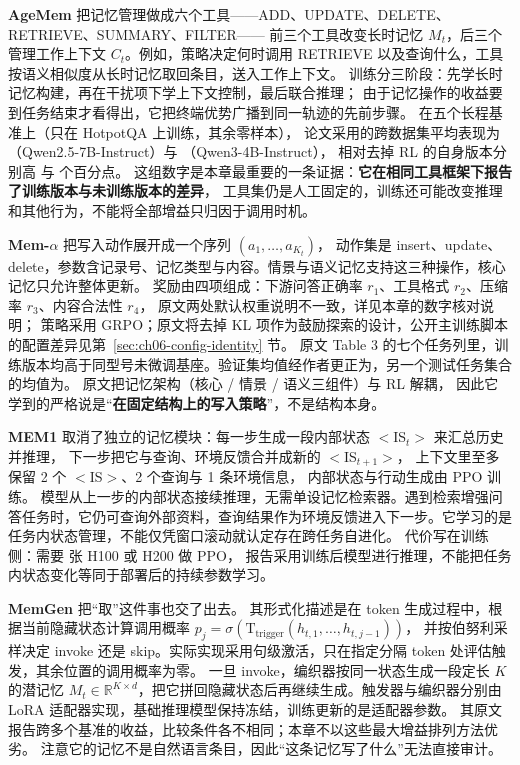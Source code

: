 \textbf{AgeMem} 把记忆管理做成六个工具——ADD、UPDATE、DELETE、RETRIEVE、SUMMARY、FILTER——
前三个工具改变长时记忆 $M_t$，后三个管理工作上下文 $C_t$。例如，策略决定何时调用 RETRIEVE 以及查询什么，工具按语义相似度从长时记忆取回条目，送入工作上下文。
训练分三阶段：先学长时记忆构建，再在干扰项下学上下文控制，最后联合推理；
由于记忆操作的收益要到任务结束才看得出，它把终端优势广播到同一轨迹的先前步骤\cite{agemem-2601}。
在五个长程基准上（只在 HotpotQA 上训练，其余零样本），
论文采用的跨数据集平均表现为 （Qwen2.5-7B-Instruct）与 （Qwen3-4B-Instruct），
相对去掉 RL 的自身版本分别高  与  个百分点\cite{agemem-2601}。
这组数字是本章最重要的一条证据：\textbf{它在相同工具框架下报告了训练版本与未训练版本的差异}，
工具集仍是人工固定的，训练还可能改变推理和其他行为，不能将全部增益只归因于调用时机。

\textbf{Mem-$\alpha$} 把写入动作展开成一个序列 $(a_1,\dots,a_{K_t})$，
动作集是 insert、update、delete，参数含记录号、记忆类型与内容。情景与语义记忆支持这三种操作，核心记忆只允许整体更新。
奖励由四项组成：下游问答正确率 $r_1$、工具格式 $r_2$、压缩率 $r_3$、内容合法性 $r_4$，
原文两处默认权重说明不一致，详见本章的数字核对说明；
策略采用 GRPO；原文将去掉 KL 项作为鼓励探索的设计，公开主训练脚本的配置差异见第~\ref{sec:ch06-config-identity} 节\cite{memalpha-2509,memalpha-code-2025}。
原文 Table 3 的七个任务列里，训练版本均高于同型号未微调基座\cite{memalpha-2509}。验证集均值经作者更正为，另一个测试任务集合的均值为\cite{memalpha-erratum-2025}。
原文把记忆架构（核心 / 情景 / 语义三组件）与 RL 解耦，
因此它学到的严格说是“\textbf{在固定结构上的写入策略}”，不是结构本身。

\textbf{MEM1} 取消了独立的记忆模块：每一步生成一段内部状态 $<$\!IS$_t>$ 来汇总历史并推理，
下一步把它与查询、环境反馈合并成新的 $<$\!IS$_{t+1}>$，
上下文里至多保留 2 个 $<$\!IS$>$、2 个查询与 1 条环境信息，
内部状态与行动生成由 PPO 训练\cite{mem1-2506}。
模型从上一步的内部状态接续推理，无需单设记忆检索器。遇到检索增强问答任务时，它仍可查询外部资料，查询结果作为环境反馈进入下一步。它学习的是任务内状态管理，不能仅凭窗口滚动就认定存在跨任务自进化。
代价写在训练侧：需要  张 H100 或 H200 做 PPO，
报告采用训练后模型进行推理，不能把任务内状态变化等同于部署后的持续参数学习\cite{mem1-2506}。

\textbf{MemGen} 把“取”这件事也交了出去。
其形式化描述是在 token 生成过程中，根据当前隐藏状态计算调用概率
$p_j=\sigma(\mathrm{T_{trigger}}(h_{t,1},\dots,h_{t,j-1}))$，
并按伯努利采样决定 invoke 还是 skip。实际实现采用句级激活，只在指定分隔 token 处评估触发，其余位置的调用概率为零\cite{memgen-2509}。
一旦 invoke，编织器按同一状态生成一段定长 $K$ 的潜记忆
$M_t\in\mathbb{R}^{K\times d}$，把它拼回隐藏状态后再继续生成\cite{memgen-2509}。触发器与编织器分别由 LoRA 适配器实现，基础推理模型保持冻结，训练更新的是适配器参数\cite{memgen-2509}。
其原文报告跨多个基准的收益，比较条件各不相同；本章不以这些最大增益排列方法优劣\cite{memgen-2509}。
注意它的记忆不是自然语言条目，因此“这条记忆写了什么”无法直接审计。

